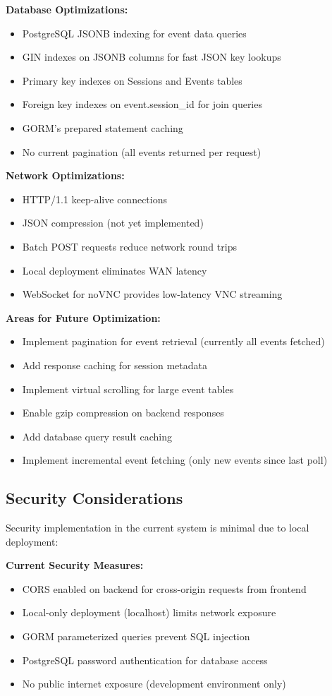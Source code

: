 \textbf{Database Optimizations:}
\begin{itemize}
    \item PostgreSQL JSONB indexing for event data queries
    \item GIN indexes on JSONB columns for fast JSON key lookups
    \item Primary key indexes on Sessions and Events tables
    \item Foreign key indexes on event.session\_id for join queries
    \item GORM's prepared statement caching
    \item No current pagination (all events returned per request)
\end{itemize}

\textbf{Network Optimizations:}
\begin{itemize}
    \item HTTP/1.1 keep-alive connections
    \item JSON compression (not yet implemented)
    \item Batch POST requests reduce network round trips
    \item Local deployment eliminates WAN latency
    \item WebSocket for noVNC provides low-latency VNC streaming
\end{itemize}

\textbf{Areas for Future Optimization:}
\begin{itemize}
    \item Implement pagination for event retrieval (currently all events fetched)
    \item Add response caching for session metadata
    \item Implement virtual scrolling for large event tables
    \item Enable gzip compression on backend responses
    \item Add database query result caching
    \item Implement incremental event fetching (only new events since last poll)
\end{itemize}

\subsection{Security Considerations}

Security implementation in the current system is minimal due to local deployment:

\textbf{Current Security Measures:}
\begin{itemize}
    \item CORS enabled on backend for cross-origin requests from frontend
    \item Local-only deployment (localhost) limits network exposure
    \item GORM parameterized queries prevent SQL injection
    \item PostgreSQL password authentication for database access
    \item No public internet exposure (development environment only)
\end{itemize}

